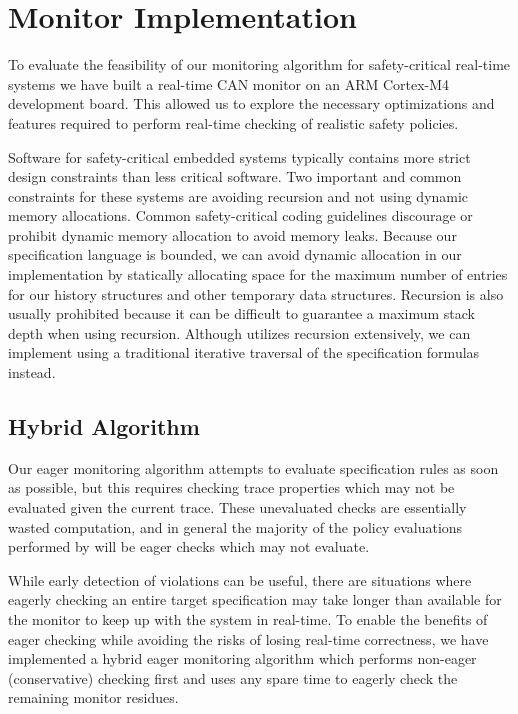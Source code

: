 
\section{Monitor Implementation}

To evaluate the feasibility of our monitoring algorithm for safety-critical real-time systems we have built a real-time CAN monitor on an ARM Cortex-M4 development board. This allowed us to explore the necessary optimizations and features required to perform real-time checking of realistic safety policies.


Software for safety-critical embedded systems typically contains more strict design constraints than less critical software. Two important and common constraints for these systems are avoiding recursion and not using dynamic memory allocations. 
Common safety-critical coding guidelines discourage or prohibit dynamic memory allocation to avoid memory leaks.
Because our specification language is bounded, we can avoid dynamic allocation in our \monitor implementation by statically allocating space for the maximum number of entries for our history structures and other temporary data structures.
Recursion is also usually prohibited because it can be difficult to guarantee a maximum stack depth when using recursion. Although \monitor utilizes recursion extensively, we can implement \monitor using a traditional iterative traversal of the specification formulas instead.

\subsection{Hybrid Algorithm}
Our eager monitoring algorithm attempts to evaluate specification rules as soon as possible, but this requires checking trace properties which may not be evaluated given the current trace. These unevaluated checks are essentially wasted computation, and in general the majority of the policy evaluations performed by \monitor will be eager checks which may not evaluate.

While early detection of violations can be useful, there are situations where eagerly checking an entire target specification may take longer than available for the monitor to keep up with the system in real-time.
%
To enable the benefits of eager checking while avoiding the risks of losing real-time correctness, we have implemented a hybrid eager monitoring algorithm which performs non-eager (conservative) checking first and uses any spare time to eagerly check the remaining monitor residues.

